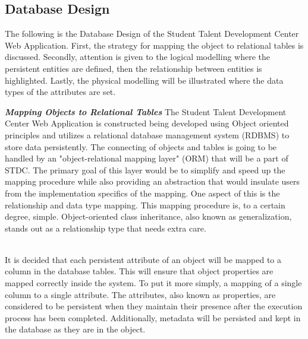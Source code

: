 \subsection{Database Design}
\begin{justify}
The following is the Database Design of the Student Talent Development Center Web Application. First, the strategy for mapping the object to relational tables is discussed. Secondly, attention is given to the logical modelling where the persistent entities are defined, then the relationship between entities is highlighted. Lastly, the physical modelling will be illustrated where the data types of the attributes are set.

\vspace{0.25cm}
\newendline \textbf{\textit{Mapping Objects to Relational Tables}}\newendline
The Student Talent Development Center Web Application is constructed being developed using Object oriented principles and utilizes a relational database management system (RDBMS) to store data persistently. The connecting of objects and tables is going to be handled by an "object-relational mapping layer" (ORM) that will be a part of STDC. The primary goal of this layer would be to simplify and speed up the mapping procedure while also providing an abstraction that would insulate users from the implementation specifics of the mapping. One aspect of this is the relationship and data type mapping. This mapping procedure is, to a certain degree, simple. Object-oriented class inheritance, also known as generalization, stands out as a relationship type that needs extra care.

\vspace{0.25cm}
\\
It is decided that each persistent attribute of an object will be mapped to a column in the database tables. This will ensure that object properties are mapped correctly inside the system. To put it more simply, a mapping of a single column to a single attribute. The attributes, also known as properties, are considered to be persistent when they maintain their presence after the execution process has been completed. Additionally, metadata will be persisted and kept in the database as they are in the object.


\end{justify}
